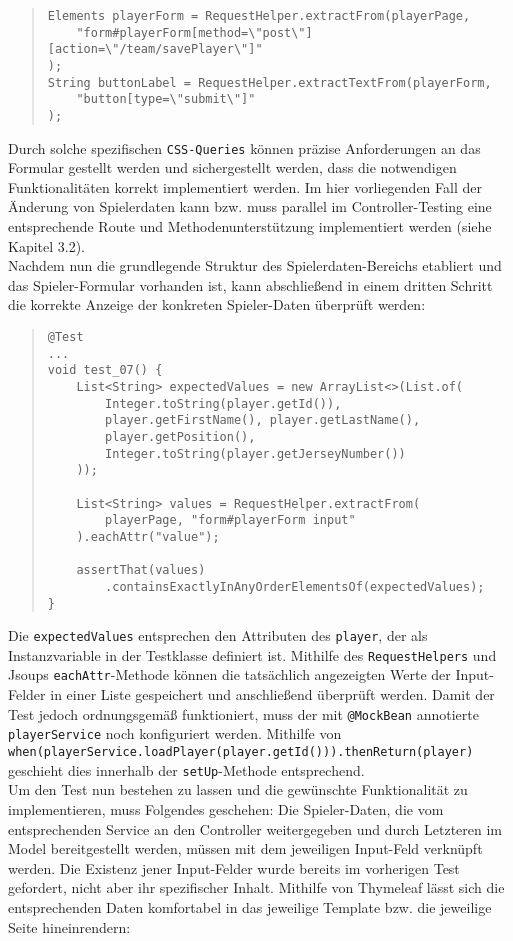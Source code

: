 \begin{quote}
\begin{verbatim}
Elements playerForm = RequestHelper.extractFrom(playerPage, 
    "form#playerForm[method=\"post\"][action=\"/team/savePlayer\"]"
);
String buttonLabel = RequestHelper.extractTextFrom(playerForm, 
    "button[type=\"submit\"]"
);
\end{verbatim}
\end{quote}

Durch solche spezifischen \texttt{CSS-Queries} können präzise Anforderungen an das 
Formular gestellt werden und sichergestellt werden, dass die notwendigen 
Funktionalitäten korrekt implementiert werden. Im hier vorliegenden Fall der 
Änderung von Spielerdaten kann bzw. muss parallel im Controller-Testing eine 
entsprechende Route und Methodenunterstützung implementiert werden (siehe Kapitel 
3.2). \\ 
Nachdem nun die grundlegende Struktur des Spielerdaten-Bereichs etabliert und das 
Spieler-Formular vorhanden ist, kann abschließend in einem dritten Schritt die 
korrekte Anzeige der konkreten Spieler-Daten überprüft werden: 

\begin{quote}
\begin{verbatim}
@Test
...
void test_07() {
    List<String> expectedValues = new ArrayList<>(List.of(
        Integer.toString(player.getId()), 
        player.getFirstName(), player.getLastName(), 
        player.getPosition(), 
        Integer.toString(player.getJerseyNumber())
    ));

    List<String> values = RequestHelper.extractFrom(
        playerPage, "form#playerForm input"
    ).eachAttr("value");

    assertThat(values)
        .containsExactlyInAnyOrderElementsOf(expectedValues);
}
\end{verbatim}
\end{quote}

Die \texttt{expectedValues} entsprechen den Attributen des \texttt{player}, der als 
Instanzvariable in der Testklasse definiert ist. Mithilfe des 
\texttt{RequestHelpers} und Jsoups \texttt{eachAttr}-Methode können die tatsächlich 
angezeigten Werte der Input-Felder in einer Liste gespeichert und anschließend 
überprüft werden. Damit der Test jedoch ordnungsgemäß funktioniert, muss der mit 
\texttt{@MockBean} annotierte \texttt{playerService} noch konfiguriert werden. 
Mithilfe von 
\texttt{when(playerService.loadPlayer(player.getId())).thenReturn(player)} 
geschieht dies innerhalb der \texttt{setUp}-Methode entsprechend. \\ 
Um den Test nun bestehen zu lassen und die gewünschte Funktionalität zu 
implementieren, muss Folgendes geschehen: Die Spieler-Daten, die vom 
entsprechenden Service an den Controller weitergegeben und durch Letzteren im 
Model bereitgestellt werden, müssen mit dem jeweiligen Input-Feld verknüpft werden. 
Die Existenz jener Input-Felder wurde bereits im vorherigen Test gefordert, nicht 
aber ihr spezifischer Inhalt. Mithilfe von Thymeleaf lässt sich die entsprechenden 
Daten komfortabel in das jeweilige Template bzw. die jeweilige Seite hineinrendern: 

